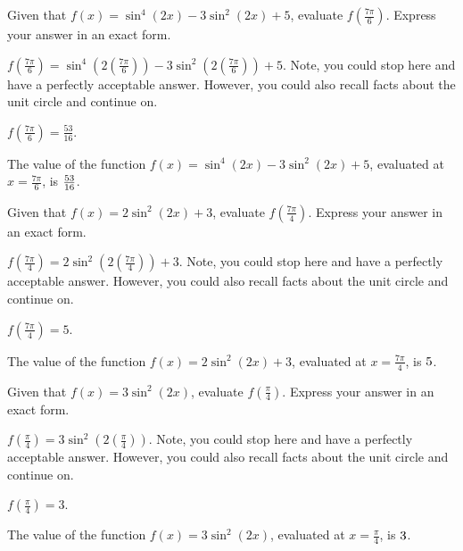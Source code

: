 \begin{shuffle}
\begin{exercise}
Given that $f(x)=\sin ^4(2 x)-3 \sin ^2(2 x)+5$, evaluate $f\left(\frac{7 \pi }{6}\right)$. Express your answer in an exact form.
\begin{solution}
\begin{hint}
$f\left(\frac{7 \pi }{6}\right)=\sin ^4(2 \left(\frac{7 \pi }{6}\right))-3 \sin ^2(2 \left(\frac{7 \pi }{6}\right))+5$. Note, you could stop here and have a perfectly acceptable answer. However, you could also recall facts about the unit circle and continue on. 
\end{hint}
\begin{hint}
$f\left(\frac{7 \pi }{6}\right)=\frac{53}{16}$.
\end{hint}
The value of the function $f(x) = \sin ^4(2 x)-3 \sin ^2(2 x)+5$, evaluated at $x=\frac{7 \pi }{6}$, is ${\frac{53}{16}}$.
\end{solution}
\end{exercise}

\begin{exercise}
Given that $f(x)=2 \sin ^2(2 x)+3$, evaluate $f\left(\frac{7 \pi }{4}\right)$. Express your answer in an exact form.
\begin{solution}
\begin{hint}
$f\left(\frac{7 \pi }{4}\right)=2 \sin ^2(2 \left(\frac{7 \pi }{4}\right))+3$. Note, you could stop here and have a perfectly acceptable answer. However, you could also recall facts about the unit circle and continue on. 
\end{hint}
\begin{hint}
$f\left(\frac{7 \pi }{4}\right)=5$.
\end{hint}
The value of the function $f(x) = 2 \sin ^2(2 x)+3$, evaluated at $x=\frac{7 \pi }{4}$, is ${5}$.
\end{solution}
\end{exercise}

\begin{exercise}
Given that $f(x)=3 \sin ^2(2 x)$, evaluate $f\left(\frac{\pi }{4}\right)$. Express your answer in an exact form.
\begin{solution}
\begin{hint}
$f\left(\frac{\pi }{4}\right)=3 \sin ^2(2 \left(\frac{\pi }{4}\right))$. Note, you could stop here and have a perfectly acceptable answer. However, you could also recall facts about the unit circle and continue on. 
\end{hint}
\begin{hint}
$f\left(\frac{\pi }{4}\right)=3$.
\end{hint}
The value of the function $f(x) = 3 \sin ^2(2 x)$, evaluated at $x=\frac{\pi }{4}$, is ${3}$.
\end{solution}
\end{exercise}


\end{shuffle}
